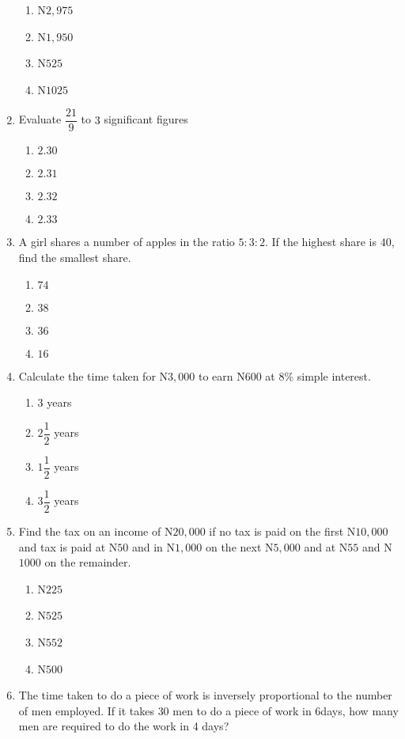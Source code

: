 \begin{multicols}{2}
\begin{enumerate}[label={\arabic*.}]
    \begin{enumerate}[label={\Alph*.}]
    \item N\(2,975\)
    \item N\(1,950\)
    \item N\(525\)
    \item N\(1025\)
    \end{enumerate}
\item Evaluate \(\dfrac{21}{9}\) to \(3\) significant figures
    \begin{enumerate}[label={\Alph*.}]
    \item \(2.30\)
    \item \(2.31\)
    \item \(2.32\)
    \item \(2.33\)
    \end{enumerate}
\item A girl shares a number of apples in the ratio \(5:3:2\). If the highest share is \(40\), find the smallest share.
    \begin{enumerate}[label={\Alph*.}]
    \item \(74\)
    \item \(38\)
    \item \(36\)
    \item \(16\)
    \end{enumerate}
\item Calculate the time taken for N\(3,000\) to earn N\(600\) at 8\% simple interest.
    \begin{enumerate}[label={\Alph*.}]
    \item \(3\) years
    \item \(2\dfrac{1}{2}\) years
    \item \(1\dfrac{1}{2}\) years
    \item \(3\dfrac{1}{2}\) years
    \end{enumerate}
\item Find the tax on an income of N\(20,000\) if no tax is paid on the first N\(10,000\) and tax is paid at N\(50\) and in N\(1,000\)
on the next N\(5,000\) and at N\(55\) and N\(1000\) on the remainder. 
    \begin{enumerate}[label={\Alph*.}]
    \item N\(225\)
    \item N\(525\)
    \item N\(552\)
    \item N\(500\)
    \end{enumerate}
\item The time taken to do a piece of work is inversely proportional to the number of men employed. If it takes \(30\) men to do a piece of work in \(6\)days, how many men are required to do the work in 4 days?

\end{enumerate}
\end{multicols}
